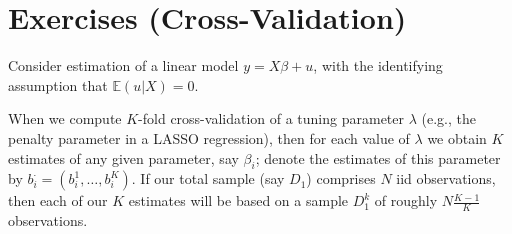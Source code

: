 \documentclass[12pt]{amsart}
\renewcommand{\E}{\ensuremath{\mathds{E}}}
\begin{document}
\section{Exercises (Cross-Validation)}
\label{sec:org95c9bad}
Consider estimation of a linear model \(y = X\beta + u\), with the
identifying assumption that \(\E(u|X)=0\).

When we compute \(K\)-fold cross-validation of a tuning parameter \(\lambda\)
(e.g., the penalty parameter in a LASSO regression), then for each value of
\(\lambda\) we obtain \(K\) estimates of any given parameter, say
\(\beta_i\); denote the estimates of this parameter by
\(b_{i}^\cdot=(b_{i}^1,\dots,b_{i}^K)\).  If our total sample (say
\(D_1\)) comprises
\(N\) iid observations, then each of our \(K\) estimates will be based
on a sample \(D_1^k\) of roughly \(N\frac{K-1}{K}\) observations.
\end{document}
